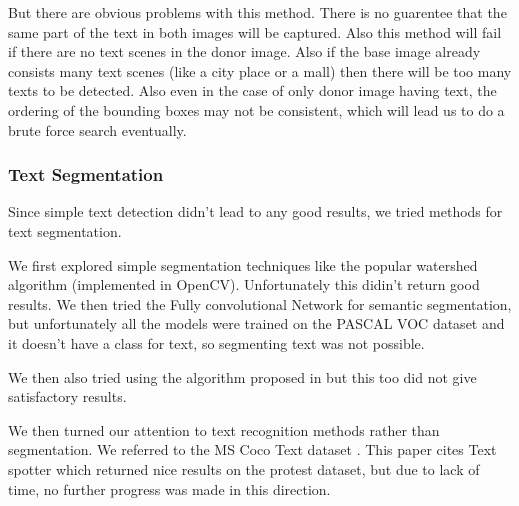 \documentclass{article}
\begin{document}
But there are obvious problems with this method. There is no guarentee that the same part of the text in both images will be captured. Also this method will fail if there are no text scenes in the donor image. Also if the base image already consists many text scenes (like a city place or a mall) then there will be too many texts to be detected. Also even in the case of only donor image having text, the ordering of the bounding boxes may not be consistent, which will lead us to do a brute force search eventually.

\subsubsection{Text Segmentation}
Since simple text detection didn't lead to any good results, we tried methods for text segmentation.

We first explored simple segmentation techniques like the popular watershed algorithm (implemented in OpenCV)\cite{opecv}. Unfortunately this didin't return good results. We then tried the Fully convolutional Network for semantic segmentation\cite{Long_2015_CVPR}, but unfortunately all the models were trained on the PASCAL VOC dataset \cite{Everingham10} and it doesn't have a class for text, so segmenting text was not possible.

We then also tried using the algorithm proposed in \cite{Felzenszwalb:2004:EGI:981793.981796} but this too did not give satisfactory results.

We then turned our attention to text recognition methods rather than segmentation. We referred to the MS Coco Text dataset \cite{veit2016cocotext}. This paper cites Text spotter\cite{Gupta16} which returned nice results on the protest dataset, but due to lack of time, no further progress was made in this direction.






\end{document}
